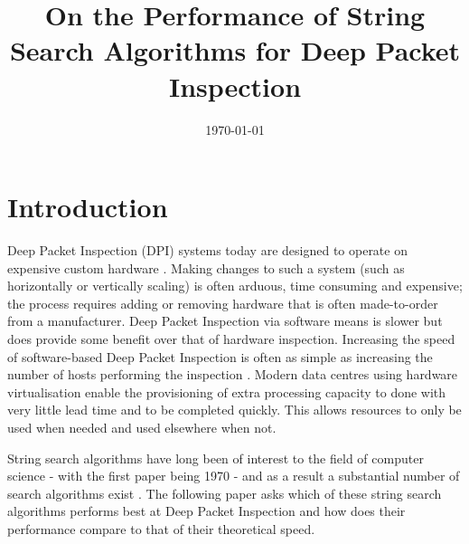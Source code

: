 \documentclass[9pt, technote]{IEEEtran}
\begin{document}
\title{On the Performance of String Search Algorithms for Deep Packet Inspection}
\date{\today}
\maketitle


\section{Introduction}

Deep Packet Inspection (DPI) systems today are designed to operate on expensive custom hardware \citep{abuhmed2007}. Making changes to such a system (such as horizontally or vertically scaling) is often arduous, time consuming and expensive; the process requires adding or removing hardware that is often made-to-order from a manufacturer. Deep Packet Inspection via software means is slower but does provide some benefit over that of hardware inspection. Increasing the speed of software-based Deep Packet Inspection is often as simple as increasing the number of hosts performing the inspection \citep{chaudhary2011}. Modern data centres using hardware virtualisation enable the provisioning of extra processing capacity to done with very little lead time and to be completed quickly. This allows resources to only be used when needed and used elsewhere when not. 

String search algorithms have long been of interest to the field of computer science - with the first paper being 1970 \citep{morris1970} - and as a result a substantial number of search algorithms exist \cite{charras2004}. The following paper asks which of these string search algorithms performs best at Deep Packet Inspection and how does their performance compare to that of their theoretical speed.
\end{document}
